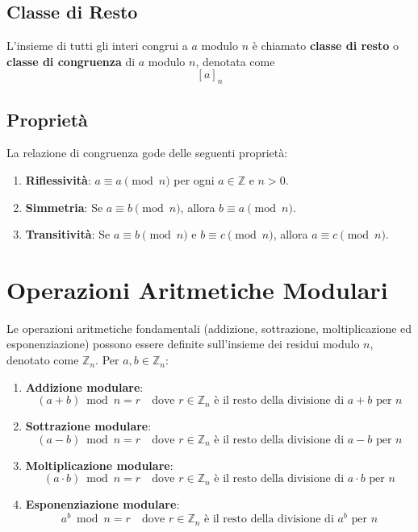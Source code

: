 \documentclass[a4paper,12pt]{report}
\begin{document}
\subsection*{Classe di Resto}
L'insieme di tutti gli interi congrui a $a$ modulo $n$ è chiamato \textbf{classe di resto} o \textbf{classe di congruenza} di $a$ modulo $n$, denotata come \[[a]_n\]

\subsection*{Proprietà}
La relazione di congruenza gode delle seguenti proprietà:

\begin{enumerate}
    \item \textbf{Riflessività}: $a \equiv a \pmod{n}$ per ogni $a \in \mathbb{Z}$ e $n > 0$.
    \item \textbf{Simmetria}: Se $a \equiv b \pmod{n}$, allora $b \equiv a \pmod{n}$.
    \item \textbf{Transitività}: Se $a \equiv b \pmod{n}$ e $b \equiv c \pmod{n}$, allora $a \equiv c \pmod{n}$.
\end{enumerate}

\section{Operazioni Aritmetiche Modulari}
Le operazioni aritmetiche fondamentali (addizione, sottrazione, moltiplicazione ed esponenziazione) possono essere definite sull'insieme dei residui modulo $n$, denotato come $\mathbb{Z}_n$. Per $a, b \in \mathbb{Z}_n$:

\begin{enumerate}
    \item \textbf{Addizione modulare}:
    $$(a + b) \bmod n = r \quad \text{dove } r \in \mathbb{Z}_n \text{ è il resto della divisione di } a+b \text{ per } n$$
    
    \item \textbf{Sottrazione modulare}:
    $$(a - b) \bmod n = r \quad \text{dove } r \in \mathbb{Z}_n \text{ è il resto della divisione di } a-b \text{ per } n$$
    
    \item \textbf{Moltiplicazione modulare}:
    $$(a \cdot b) \bmod n = r \quad \text{dove } r \in \mathbb{Z}_n \text{ è il resto della divisione di } a \cdot b \text{ per } n$$
    
    \item \textbf{Esponenziazione modulare}:
    $$a^b \bmod n = r \quad \text{dove } r \in \mathbb{Z}_n \text{ è il resto della divisione di } a^b \text{ per } n$$
\end{enumerate}
\end{document}

